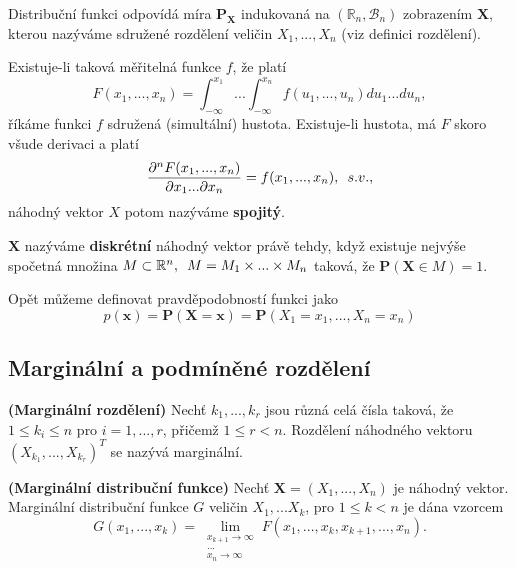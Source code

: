 Distribuční funkci odpovídá míra $\textbf{P}_{\textbf{X}}$ indukovaná na $(\mathbb{R}_{n}, \mathcal{B}_{n})$ zobrazením $\textbf{X}$, kterou nazýváme sdružené rozdělení veličin $X_{1}, ..., X_{n}$ (viz definici rozdělení).

Existuje-li taková měřitelná funkce $f$, že platí 
\begin{equation}
F(x_{1}, ..., x_{n}) = \int_{-\infty}^{x_{1}}...\int_{-\infty}^{x_{n}} f(u_{1}, ..., u_{n})du_{1}...du_{n},
\end{equation}
říkáme funkci $f$ sdružená (simultální) hustota. Existuje-li hustota, má $F$ skoro všude derivaci a platí
\begin{equation}
\frac{\partial^{n}F(x_{1}, ..., x_{n})}{\partial x_{1}...\partial x_{n}} = f(x_{1}, ..., x_{n}), \enskip s. v.,
\end{equation}
náhodný vektor $X$ potom nazýváme \textbf{spojitý}.

$\textbf{X}$ nazýváme \textbf{diskrétní} náhodný vektor právě tehdy, když existuje nejvýše spočetná množina $M \subset \mathbb{R}^{n}, \enskip M = M_{1} \times ... \times M_{n}$ taková, že $\textbf{P}(\textbf{X} \in M) = 1$.

Opět můžeme definovat pravděpodobností funkci jako
\begin{equation}
p(\textbf{x}) = \textbf{P}(\textbf{X} = \textbf{x}) = \textbf{P}(X_{1} = x_{1}, ..., X_{n} = x_{n} )
\end{equation}
\subsection{Marginální a podmíněné rozdělení}
\begin{definition}{\textbf{(Marginální rozdělení)}}
Nechť $k_{1}, ..., k_{r}$ jsou různá celá čísla taková, že $1 \leq k_{i} \leq n$ pro $i = 1, ..., r$, přičemž $1 \leq r < n.$ Rozdělení náhodného vektoru $(X_{k_{1}}, ..., X_{k_{r}})^{T}$ se nazývá marginální. 
\end{definition}
\begin{example}{\textbf{(Marginální distribuční funkce)}}
Nechť $\textbf{X} = (X_{1}, ..., X_{n})$ je náhodný vektor. Marginální distribuční funkce $G$ veličin $X_{1}, ... X_{k}$, pro $1 \leq k < n$ je dána vzorcem
\begin{equation}
G(x_{1}, ..., x_{k}) = \lim_{\substack{x_{k+1} \longrightarrow \infty \\ ... \\ x_{n} \longrightarrow \infty}} F(x_{1}, ..., x_{k}, x_{k + 1}, ..., x_{n}).
\end{equation}
\end{example}

